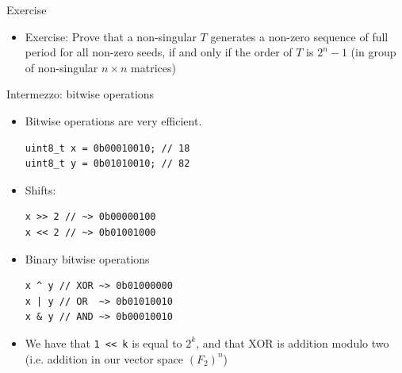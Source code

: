 \documentclass[10pt]{beamer}
\begin{document}
\begin{frame}[label={sec:orgcdcab68}]{Exercise}
\begin{itemize}
\item \alert{\alert{Exercise:}} Prove that a non-singular \(T\) generates a non-zero sequence of full period for all non-zero seeds, if and only if the order of \(T\) is \(2^{n} - 1\) (in group of non-singular \(n \times n\) matrices)
\end{itemize}
\end{frame}
\begin{frame}[fragile,label={sec:orge11967a}]{Intermezzo: bitwise operations}
 \begin{itemize}
\item Bitwise operations are very efficient.
\begin{verbatim}
uint8_t x = 0b00010010; // 18
uint8_t y = 0b01010010; // 82
\end{verbatim}
\item Shifts:
\begin{verbatim}
x >> 2 // ~> 0b00000100
x << 2 // ~> 0b01001000
\end{verbatim}
\item Binary bitwise operations
\begin{verbatim}
x ^ y // XOR ~> 0b01000000
x | y // OR  ~> 0b01010010
x & y // AND ~> 0b00010010
\end{verbatim}
\item We have that \texttt{1 << k} is equal to \(2^k\), and that XOR is addition modulo two
(i.e. addition in our vector space \((F_2)^n\))
\end{itemize}
\end{frame}
\end{document}
